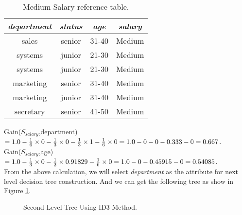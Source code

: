 \documentclass{article}
\begin{document}
\begin{enumerate}
\begin{enumerate}
\begin{table}[H]
  \begin{center}
    \begin{tabular}{|c|c|c|c|}
      \hline {\it department} & {\it status}&{\it age}&{\it salary} \\
      \hline 
      sales & senior & 31-40 & Medium \\
      systems & junior & 21-30 & Medium \\
      systems & junior & 21-30 & Medium \\
      marketing & senior & 31-40 & Medium \\
      marketing & junior & 31-40 & Medium \\
      secretary & senior & 41-50 & Medium \\
      \hline
    \end{tabular}
    \caption{Medium Salary reference table.\label{tbl:medium}}
  \end{center}
  \vspace{-10pt}
\end{table}

Gain($S_{salary}$,department)$ = 1.0 - \frac{1}{6}\times 0 -
\frac{1}{3}\times 0 - \frac{1}{3}\times 1 - \frac{1}{6}\times 0 \\
= 1.0 - 0 - 0 - 0.333 - 0 \\
= 0.667$. \\

Gain($S_{salary}$,age)$ 
= 1.0-\frac{1}{3}\times 0-\frac{1}{2}\times 0.91829-\frac{1}{6}\times 0\\
= 1.0 - 0 - 0.45915 - 0\\
= 0.54085$. \\

From the above calculation, we will select {\it department} as the
attribute for next level decision tree construction. And we can get
the following tree as show in Figure \ref{fig:id3-2}.\\

\begin{figure}[H]
  \vspace{-10pt}
  \begin{center}
    \caption{Second Level Tree Using ID3 Method.\label{fig:id3-2}}
    \vspace{-10pt}
  \end{center}
\end{figure}


\end{enumerate}
\end{enumerate}
\end{document}
